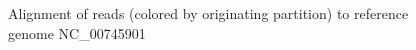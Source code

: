 \documentclass[11pt]{article} %
\begin{document}
\begin{figure}[h!]
\caption{Alignment of reads (colored by originating partition) to reference genome NC\_00745901}
\label{diginormreference}
\end{figure}
\end{document}

